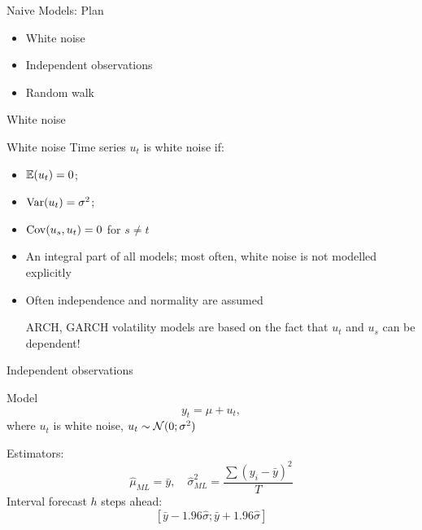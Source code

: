 \begin{frame} %
	
	
\end{frame}



\begin{frame}{Naive Models: Plan}
	\begin{itemize}[<+->]
		\item White noise
		\item Independent observations
		\item Random walk
	\end{itemize}
	
\end{frame}

\begin{frame}{White noise}
	
	\begin{block}{White noise}
		Time series $u_t$ is white noise if:
		\begin{itemize}
			\item $\mathbb{E}(u_t) = 0$;
			\item $\operatorname{Var}(u_t) = \sigma^2$;
			\item $\operatorname{Cov}(u_s, u_t) = 0$ for $s\neq t$
		\end{itemize}
	\end{block}
	
	\pause
	\begin{itemize}[<+->]
		\item An integral part of all models; most often, white noise is not modelled explicitly
		\item Often \alert{independence} and \alert{normality} are  assumed 

		
		ARCH, GARCH volatility models are based on the fact that $u_t$ and $u_s$ can be dependent!
	\end{itemize}
	
\end{frame}


\begin{frame}{Independent observations}
	
	\begin{block}{Model}
		\[
		y_t = \mu + u_t,
		\]
		where $u_t$ is white noise, $u_t \sim \mathcal{N}(0;\sigma^2)$
	\end{block}
	\pause
	\alert{Estimators:}
	\[
	\hat \mu_{ML} = \bar y, \quad \hat\sigma^2_{ML} = \frac{\sum(y_i - \bar y)^2}{T}
	\]
	\pause
	\alert{Interval forecast} $h$ steps ahead:
	\[
	[\bar y - 1.96 \hat\sigma; \bar y + 1.96 \hat \sigma]
	\]
\end{frame}


